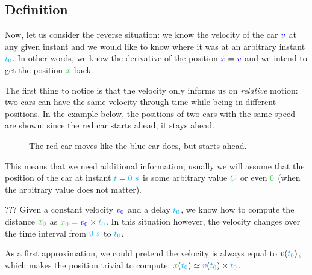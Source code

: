 \subsection{Definition}

Now, let us consider the reverse situation: we know the velocity of the
car $\textcolor{blue}{v}$ at any given instant and we would like to know where it
was at an arbitrary instant $\textcolor{cyan}{t_0}$. In other words, we know the
derivative of the position $\textcolor{blue}{\dot x} = \textcolor{blue}{v}$ and we intend
to get the position $\posit{x}$ back.

The first thing to notice is that the velocity only informs us on
\textit{relative} motion: two cars can have the same velocity through time
while being in different positions. In the example below, the positions of two
cars with the same speed are shown; since the red car starts ahead, it stays
ahead.

\begin{figure}[H]
\centering
{}
\caption{
	The red car moves like the blue car does, but starts ahead.
}
\end{figure}

This means that we need additional information; usually we will assume that the
position of the car at instant $\textcolor{cyan}{t} = \textcolor{cyan}{0~s}$ is some arbitrary
value $\posit{C}$ or even $\posit{0}$ (when the arbitrary value does not
matter).

???
Given a constant velocity $\textcolor{blue}{v_0}$ and a delay $\textcolor{cyan}{t_0}$,
we know how to compute the distance $\posit{x_0}$ as $\posit{x_0} =
\speed{v_0} \times \delay{t_0}$. In this situation however, the velocity
changes over the time interval from $\textcolor{cyan}{0~s}$ to $\textcolor{cyan}{t_0}$.

As a first approximation, we could pretend the velocity is always
equal to $\textcolor{blue}{v}(\textcolor{cyan}{t_0})$, which makes the position trivial
to compute: $\posit{x}(\delay{t_0}) \simeq \speed{v}(\delay{t_0})
\times \delay{t_0}$.

